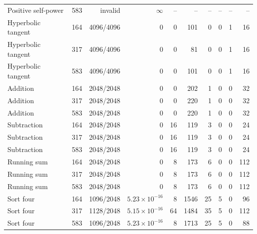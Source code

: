 \begin{table}[p]
\begin{tabular}{@{}lr r r r r r r r r@{}}
Positive self-power & 583 & invalid & $\infty$ & -- & -- & -- & -- & -- & --\\

\addlinespace[2pt]

Hyperbolic tangent & 164 & 4096/4096 & 0 & 0 & 101 & 0 & 0 & 1 & 16\\

Hyperbolic tangent & 317 & 4096/4096 & 0 & 0 & 81 & 0 & 0 & 1 & 16\\

Hyperbolic tangent & 583 & 4096/4096 & 0 & 0 & 101 & 0 & 0 & 1 & 16\\

\addlinespace[2pt]

Addition & 164 & 2048/2048 & 0 & 0 & 202 & 1 & 0 & 0 & 32\\

Addition & 317 & 2048/2048 & 0 & 0 & 220 & 1 & 0 & 0 & 32\\

Addition & 583 & 2048/2048 & 0 & 0 & 220 & 1 & 0 & 0 & 32\\

\addlinespace[2pt]

Subtraction & 164 & 2048/2048 & 0 & 16 & 119 & 3 & 0 & 0 & 24\\

Subtraction & 317 & 2048/2048 & 0 & 16 & 119 & 3 & 0 & 0 & 24\\

Subtraction & 583 & 2048/2048 & 0 & 16 & 119 & 3 & 0 & 0 & 24\\

\addlinespace[2pt]

Running sum & 164 & 2048/2048 & 0 & 8 & 173 & 6 & 0 & 0 & 112\\

Running sum & 317 & 2048/2048 & 0 & 8 & 173 & 6 & 0 & 0 & 112\\

Running sum & 583 & 2048/2048 & 0 & 8 & 173 & 6 & 0 & 0 & 112\\

\addlinespace[2pt]

Sort four & 164 & 1096/2048 & $5.23\times10^{-16}$ & 8 & 1546 & 25 & 5 & 0 & 96\\

Sort four & 317 & 1128/2048 & $5.15\times10^{-16}$ & 64 & 1484 & 35 & 5 & 0 & 112\\

Sort four & 583 & 1096/2048 & $5.23\times10^{-16}$ & 8 & 1713 & 25 & 5 & 0 & 88\\


\end{tabular}
\end{table}
